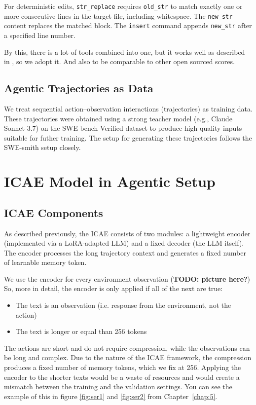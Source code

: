 For deterministic edits, \texttt{str\_replace} requires \texttt{old\_str} to match exactly one or more consecutive lines in the target file, including whitespace.
The \texttt{new\_str} content replaces the matched block.
The \texttt{insert} command appends \texttt{new\_str} after a specified line number.

By this, there is a lot of tools combined into one, but it works well as described in \cite{swe-smith}, so we adopt it. 
And also to be comparable to other open sourced scores.

\subsection{Agentic Trajectories as Data}
We treat sequential action--observation interactions (trajectories) as training data.
These trajectories were obtained using a strong teacher model (e.g., Claude Sonnet 3.7) on the SWE-bench Verified dataset to produce high-quality inputs suitable for futher training.
The setup for generating these trajectories follows the SWE-smith setup closely\cite{swe-smith}.

\section{ICAE Model in Agentic Setup}

\subsection{ICAE Components}
As described previously, the ICAE \cite{ge_context_2024} consists of two modules: a lightweight encoder (implemented via a LoRA-adapted LLM) and a fixed decoder (the LLM itself).
The encoder processes the long trajectory context and generates a fixed number of learnable memory token.

We use the encoder for every environment observation (\textbf{TODO: picture here?})
So, more in detail, the encoder is only applied if all of the next are true:
\begin{itemize}
  \item The text is an observation (i.e. response from the environment, not the action)
  \item The text is longer or equal than 256 tokens
\end{itemize}
The actions are short and do not require compression, while the observations can be long and complex.
Due to the nature of the ICAE framework, the compression produces a fixed number of memory tokens, which we fix at 256.
Applying the encoder to the shorter texts would be a waste of resources and would create a mismatch between the training and the validation settings.
You can see the example of this in figure \ref{fig:ser1} and \ref{fig:ser2} from Chapter~\ref{chap:5}.

